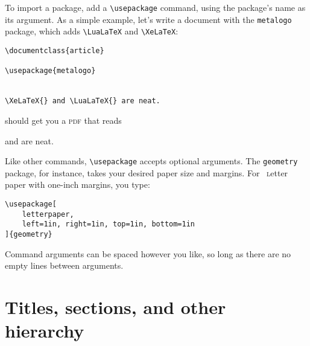 To import a package, add a \verb|\usepackage| command,
using the package's name as its argument.
As a simple example, let's write a document with the \texttt{metalogo}
package, which adds \verb|\LuaLaTeX| and \verb|\XeLaTeX|:
\begin{leftfigure}
\begin{lstlisting}
\documentclass{article}

\usepackage{metalogo}


\XeLaTeX{} and \LuaLaTeX{} are neat.

\end{lstlisting}
\end{leftfigure}
\begin{samepage}
should get you a \textsc{pdf} that reads
\begin{leftfigure}
\lm \XeLaTeX{} and \LuaLaTeX{} are neat.
\end{leftfigure}
\end{samepage}
Like other commands, \verb|\usepackage| accepts optional arguments.
The \texttt{geometry} package, for instance,
takes your desired paper size and margins.
For ~\textsc{l}etter paper with one-inch margins,
you type:
\begin{leftfigure}
\begin{lstlisting}
\usepackage[
    letterpaper,
    left=1in, right=1in, top=1in, bottom=1in
]{geometry}
\end{lstlisting}
\end{leftfigure}
Command arguments can be spaced however you like,
so long as there are no empty lines between arguments.

\section{Titles, sections, and other hierarchy}

